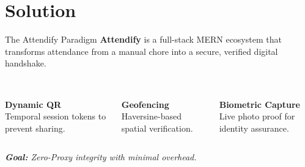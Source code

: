 \documentclass[11pt, aspectratio=169]{beamer}
\begin{document}
\section{Solution}
\begin{frame}{The Attendify Paradigm}
    \textbf{Attendify} is a full-stack MERN ecosystem that transforms attendance from a manual chore into a secure, verified digital handshake.
    \vspace{0.4cm}
    \begin{columns}
        \begin{center}
            \textcolor{accentteal}{\Huge \faQrcode} \\
            \textbf{Dynamic QR} \\
            \scriptsize Temporal session tokens to prevent sharing.
        \end{center}
        \begin{center}
           \textcolor{accentteal}{\Huge \faMapMarker}\\
            \textbf{Geofencing} \\
            \scriptsize Haversine-based spatial verification.
        \end{center}
        \begin{center}
            \textcolor{accentteal}{\Huge \faCamera} \\
            \textbf{Biometric Capture} \\
            \scriptsize Live photo proof for identity assurance.
        \end{center}
    \end{columns}
    \vfill
    \begin{center}
        \textit{\textbf{Goal:} Zero-Proxy integrity with minimal overhead.}
    \end{center}
\end{frame}

\end{document}
